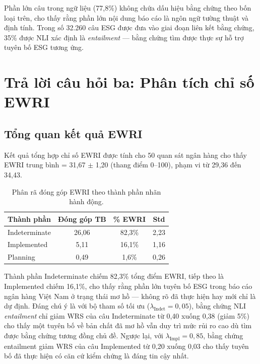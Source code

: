 Phần lớn câu trong ngữ liệu (77,8\%) không chứa dấu hiệu bằng chứng theo bốn loại trên, cho thấy rằng phần lớn nội dung báo cáo là ngôn ngữ tường thuật và định tính. Trong số 32.260 câu ESG được đưa vào giai đoạn liên kết bằng chứng, 35\% được NLI xác định là \textit{entailment} --- bằng chứng tìm được thực sự hỗ trợ tuyên bố ESG tương ứng.

\section{Trả lời câu hỏi ba: Phân tích chỉ số EWRI}
\label{sec:rq3}

\subsection{Tổng quan kết quả EWRI}
\label{subsec:ewri_overview}

Kết quả tổng hợp chỉ số EWRI được tính cho 50 quan sát ngân hàng cho thấy EWRI trung bình = 31,67 $\pm$ 1,20 (thang điểm 0--100), phạm vi từ 29,36 đến 34,43.

\begin{table}[H]
\centering
\caption{Phân rã đóng góp EWRI theo thành phần nhãn hành động.}
\label{tab:ewri_decomposition}
\begin{tabular}{lccc}
\toprule
\textbf{Thành phần} & \textbf{Đóng góp TB} & \textbf{\% EWRI} & \textbf{Std} \\
\midrule
Indeterminate & 26,06 & 82,3\% & 2,23 \\
Implemented   &  5,11 & 16,1\% & 1,16 \\
Planning      &  0,49 &  1,6\% & 0,26 \\
\bottomrule
\end{tabular}
\end{table}

Thành phần Indeterminate chiếm 82,3\% tổng điểm EWRI, tiếp theo là Implemented chiếm 16,1\%, cho thấy rằng phần lớn tuyên bố ESG trong báo cáo ngân hàng Việt Nam ở trạng thái mơ hồ --- không rõ đã thực hiện hay mới chỉ là dự định. Đáng chú ý là với bộ tham số tối ưu ($\lambda_{\text{Indet}}=0{,}05$), bằng chứng NLI \textit{entailment} chỉ giảm WRS của câu Indeterminate từ 0,40 xuống 0,38 (giảm 5\%) cho thấy một tuyên bố về bản chất đã mơ hồ vẫn duy trì mức rủi ro cao dù tìm được bằng chứng tương đồng chủ đề. Ngược lại, với $\lambda_{\text{Impl}}=0{,}85$, bằng chứng entailment giảm WRS của câu Implemented từ 0,20 xuống 0,03 cho thấy tuyên bố đã thực hiện có căn cứ kiểm chứng là đáng tin cậy nhất.

